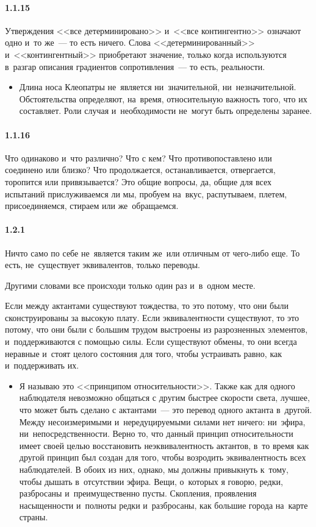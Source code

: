 \paragraph{1.1.15}\hypertarget{par:1.1.15}{} Утверждения <<все детерминировано>> и~<<все контингентно>> означают одно и~то же~--- то есть ничего. Слова <<детерминированный>> и~<<контингентный>> приобретают
значение, только когда используются в~разгар описания градиентов сопротивления~--- то есть, реальности.
	\begin{itemize}
	\item Длина носа Клеопатры не~является ни~значительной, ни~незначительной. Обстоятельства определяют, на~время, относительную важность того, что их составляет. Роли случая и~необходимости не~могут быть определены заранее.

	\end{itemize}

\paragraph{1.1.16}\hypertarget{par:1.1.16}{} Что одинаково и~что различно? Что с кем? Что противопоставлено или соединено или близко? Что продолжается, останавливается, отвергается, торопится или привязывается? Это общие вопросы, да, общие для всех испытаний прислуживаемся ли мы, пробуем на~вкус, распутываем, плетем, присоединяемся, стираем или же~обращаемся.

\paragraph{1.2.1}\hypertarget{par:1.2.1}{} Ничто само по себе не~является таким же~или отличным от чего-либо еще. То есть, не~существует эквивалентов, только переводы.

Другими словами все происходи только один раз и~в~одном месте.

Если между актантами существуют тождества, то это потому, что они были сконструированы за высокую плату. Если эквивалентности существуют, то это потому, что они были с большим трудом выстроены из разрозненных элементов, и~поддерживаются с помощью силы. Если существуют обмены, то они всегда неравные и~стоят целого состояния для того, чтобы устраивать равно, как и~поддерживать их.
	\begin{itemize}
	\item Я называю это <<принципом относительности>>. Также как для одного наблюдателя невозможно общаться с другим быстрее скорости света, лучшее, что может быть сделано с актантами~--- это перевод одного актанта в~другой. Между несоизмеримыми и~нередуцируемыми силами нет ничего: ни~эфира, ни~непосредственности. Верно то, что данный принцип относительности имеет своей целью восстановить неэквивалентность актантов, в~то время как другой принцип был создан для того, чтобы возродить эквивалентность всех наблюдателей. В обоих из них, однако, мы должны привыкнуть к~тому, чтобы дышать в~отсутствии эфира. Вещи, о~которых я говорю, редки, разбросаны и~преимущественно пусты. Скопления, проявления насыщенности и~полноты редки и~разбросаны, как большие города на~карте страны.

	\end{itemize}

